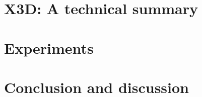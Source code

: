 \documentclass[11pt,a4paper]{article}
\theoremstyle{definition}
\theoremstyle{remark}
\begin{document}
\section{X3D: A technical summary}




\newpage
\section{Experiments}



\newpage
\section{Conclusion and discussion}




\newpage


\end{document}
